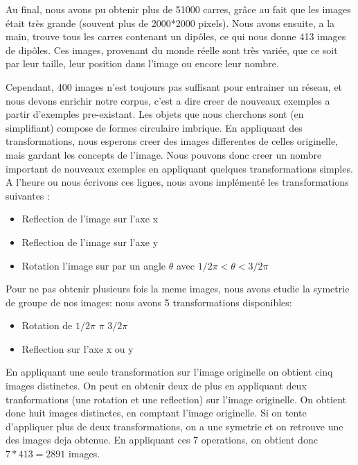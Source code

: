 \documentclass[a4paper, 12pt, titlepage, oneside, french]{article}
\begin{document}
Au final, nous avons pu obtenir plus de 51000 carres, grâce au fait que les images était très grande (souvent plus de 2000*2000 pixels). Nous avons ensuite, a la main, trouve tous les carres contenant un dipôles, ce qui nous donne 413 images de dipôles. Ces images, provenant du monde réelle sont très variée, que ce soit par leur taille, leur position dans l'image ou encore leur nombre.

	Cependant, 400 images n'est toujours pas suffisant pour entrainer un réseau, et nous devons enrichir notre corpus, c'est a dire creer de nouveaux exemples a partir d'exemples pre-existant. Les objets que nous cherchons sont (en simplifiant) compose de formes circulaire imbrique. En appliquant des transformations, nous esperons creer des images differentes de celles originelle, mais gardant les concepts de l'image. Nous pouvons donc creer un nombre important de nouveaux exemples en appliquant quelques transformations simples. A l'heure ou nous écrivons ces lignes, nous avons implémenté les transformations suivantes :
	\begin{itemize}
		\item Reflection de l'image sur l'axe x %
		\item Reflection de l'image sur l'axe y 
		\item Rotation l'image sur par un angle $\theta$ avec $1/2\pi < \theta < 3/2\pi$  
	\end{itemize}
Pour ne pas obtenir plusieurs fois la meme images, nous avons etudie la symetrie de groupe de nos images: nous avons 5 transformations disponibles: 
	\begin{itemize}
		\item Rotation de $1/2\pi$ $\pi$ $3/2\pi$
		\item Reflection sur l'axe x ou y
	\end{itemize}
	En appliquant une seule transformation sur l'image originelle on obtient cinq images distinctes. On peut en obtenir deux de plus en appliquant deux tranformations (une rotation et une reflection) sur l'image originelle. On obtient donc huit images distinctes, en comptant l'image originelle. Si on tente d'appliquer plus de deux transformations, on a une symetrie et on retrouve une des images deja obtenue.
	En appliquant ces 7 operations, on obtient donc $7*413 = 2891$ images.  
\end{document}
